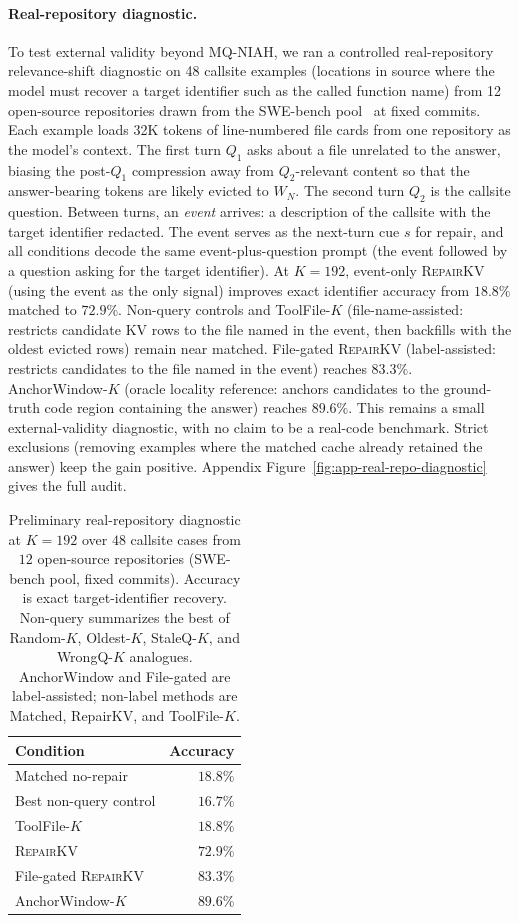 \documentclass{article}
\newcommand{\repairkv}{\textsc{RepairKV}}
\begin{document}
\paragraph{Real-repository diagnostic.}
To test external validity beyond MQ-NIAH, we ran a
controlled real-repository relevance-shift diagnostic on 48 callsite
examples (locations in source where the model must recover a target
identifier such as the called function name) from 12 open-source
repositories drawn from the SWE-bench pool~\citep{swebench} at fixed
commits.
Each example loads 32K tokens of line-numbered file cards from one
repository as the model's context. The first turn $Q_1$ asks about a
file unrelated to the answer, biasing the post-$Q_1$ compression away
from $Q_2$-relevant content so that the answer-bearing tokens are
likely evicted to $W_N$. The second turn $Q_2$ is the callsite
question.
Between turns, an \emph{event} arrives: a description of the
callsite with the target identifier redacted. The event serves as
the next-turn cue $s$ for repair, and all conditions decode the same
event-plus-question prompt (the event followed by a question asking
for the target identifier).
At $K=192$, event-only \repairkv{} (using the event as the only
signal) improves exact identifier accuracy from $18.8\%$ matched to
$72.9\%$.
Non-query controls and ToolFile-$K$ (file-name-assisted: restricts
candidate KV rows to the file named in the event, then backfills
with the oldest evicted rows) remain near matched. File-gated
\repairkv{} (label-assisted: restricts candidates to the file named
in the event) reaches $83.3\%$. AnchorWindow-$K$ (oracle locality
reference: anchors candidates to the ground-truth code region
containing the answer) reaches $89.6\%$.
This remains a small external-validity diagnostic, with no claim to
be a real-code benchmark. Strict exclusions (removing examples where
the matched cache already retained the answer) keep the gain
positive.
Appendix Figure~\ref{fig:app-real-repo-diagnostic} gives the full
audit.
\begin{table}[b]
  \centering
  \setlength{\tabcolsep}{5pt}
  \caption{Preliminary real-repository diagnostic at $K=192$ over $48$
  callsite cases from $12$ open-source repositories
  (SWE-bench pool, fixed commits). Accuracy is
  exact target-identifier recovery. Non-query summarizes the
  best of Random-$K$, Oldest-$K$, StaleQ-$K$, and WrongQ-$K$ analogues. AnchorWindow
  and File-gated are label-assisted; non-label methods are Matched,
  RepairKV, and ToolFile-$K$.}
  \label{tab:real-repo-diagnostic}
  \begin{tabular}{@{}lr@{}}
    \toprule
    Condition & Accuracy \\
    \midrule
    Matched no-repair & $18.8\%$ \\
    Best non-query control & $16.7\%$ \\
    ToolFile-$K$ & $18.8\%$ \\
    \repairkv{} & $72.9\%$ \\
    File-gated \repairkv{} & $83.3\%$ \\
    AnchorWindow-$K$ & $89.6\%$ \\
    \bottomrule
  \end{tabular}
\end{table}
\end{document}
